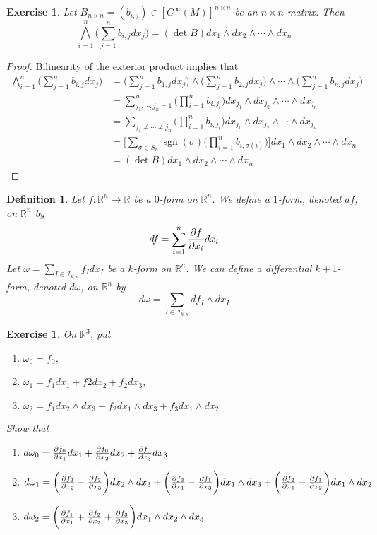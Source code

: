 \documentclass[12pt]{amsart}
\newtheorem{defn}[thm]{Definition}
\newtheorem{ex}[thm]{Exercise}
\newcommand{\sig}{\sigma}
\newcommand{\om}{\omega}
\newcommand{\R}{\mathbb{R}}
\newcommand{\MI}{\mathcal{I}}
\DeclareMathOperator{\sgn}{sgn}
\begin{document}
	\begin{ex}
		Let $B_{n\times n} = (b_{i,j}) \in [C^{\infty}(M)]^{n \times n}$ be an $n\times n$ matrix. Then $$\bigwedge_{i=1}^n \bigg(\sum_{j=1}^n b_{i,j}dx_j\bigg) = (\det B) dx_1 \wedge dx_2 \wedge \cdots \wedge dx_n$$
	\end{ex}

	\begin{proof}
		Bilinearity of the exterior product implies that
		\begin{align*}
			\bigwedge_{i=1}^n \bigg(\sum_{j=1}^n b_{i,j}dx_j\bigg)
			 &=\bigg(\sum_{j=1}^n b_{1,j}dx_j\bigg) \wedge \bigg(\sum_{j=1}^n b_{2,j}dx_j\bigg) \wedge \cdots \wedge \bigg(\sum_{j=1}^n b_{n,j}dx_j\bigg) \\
			 &= \sum_{j_1, \cdots, j_n = 1}^n \bigg( \prod_{i=1}^n b_{i, j_i} \bigg) dx_{j_1}\wedge  dx_{j_2} \wedge \cdots \wedge  dx_{j_n} \\
			 &= \sum_{j_1 \neq \cdots \neq j_n} \bigg( \prod_{i=1}^n b_{i, j_i} \bigg) dx_{j_1}\wedge  dx_{j_2} \wedge \cdots \wedge  dx_{j_n} \\
			 &= \bigg[ \sum_{\sig \in S_n} \sgn(\sig) \bigg(\prod_{i=1}^n b_{i, \sig(i)} \bigg) \bigg] dx_{1}\wedge  dx_{2} \wedge \cdots \wedge  dx_{n} \\
			 &= (\det B) dx_{1}\wedge  dx_{2} \wedge \cdots \wedge  dx_{n}
		\end{align*} 
		
	\end{proof}

	\begin{defn}
		Let $f: \R^n \rightarrow \R$ be a $0$-form on $\R^n$. We define a $1$-form, denoted $df$, on $\R^n$ by $$df = \sum_{i = 1}^n \pdv{f}{x_i} dx_i$$
		Let $\om = \sum\limits_{I \in \MI_{k,n}} f_Idx_I$ be a $k$-form on $\R^n$. We can define a differential $k+1$-form, denoted $d \om$, on $\R^n$ by $$d\om = \sum\limits_{I \in \MI_{k,n}} df_I\wedge dx_I$$  
	\end{defn}

	\begin{ex}
		On $\R^3$, put 
		\begin{enumerate}
			\item $\om_0 = f_0$, 
			\item $\om_1 = f_1 dx_1 + f2 dx_2 + f_2 dx_3$, 
			\item $\om_2 = f_1dx_2\wedge dx_3 - f_2 dx_1 \wedge dx_3 + f_3 dx_1 \wedge dx_2$
		\end{enumerate} 
		Show that
		\begin{enumerate}
			\item $d\om_0 = \pdv{f_0}{x_1}dx_1 + \pdv{f_0}{x_2}dx_2 + \pdv{f_0}{x_3}dx_3$
			\item $d \om_1 = \bigg(\pdv{f_3}{x_2} - \pdv{f_2}{x_3} \bigg) dx_2 \wedge dx_3 + \bigg( \pdv{f_3}{x_1} - \pdv{f_1}{x_3}\bigg)dx_1 \wedge dx_3 + \bigg( \pdv{f_2}{x_1} - \pdv{f_1}{x_2} \bigg) dx_1 \wedge dx_2$
			\item $d \om_2 = \bigg( \pdv{f_1}{x_1} + \pdv{f_2}{x_2} + \pdv{f_3}{x_3} \bigg) dx_1 \wedge dx_2 \wedge dx_3$ 
		\end{enumerate}
	\end{ex}
\end{document}
